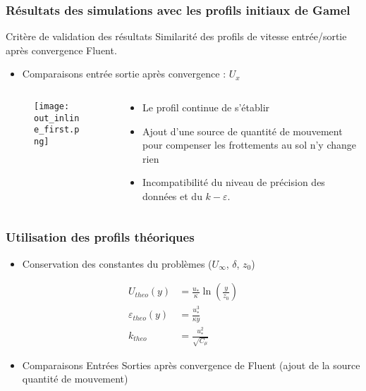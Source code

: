 \documentclass[12pt, xcolor=svgnames]{beamer}
\newcommand{\keps}{$k-\varepsilon$}
\newcommand{\qttmvt}{quantité de mouvement}
\newcommand{\bwarrow}{\item[\color{DarkRed} \ding{227}]}
\newcommand{\bepar}[1]{
	\left( #1 \right)  
}
\begin{document}
\begin{frame}
\frametitle{Résultats des simulations avec les profils initiaux de Gamel}
	\begin{block}{Critère de validation des résultats}
		Similarité des profils de vitesse entrée/sortie après convergence Fluent.
	\end{block}	
	\pause
	\begin{itemize}
		\bwarrow Comparaisons entrée sortie après convergence : $U_x$
	\end{itemize}
\begin{columns}
\begin{column}{0.5\textwidth}
\vspace{-1.1cm}
\begin{figure}[!ht]
\centering
\texttt{[image: out\_inline\_first.png]}
\end{figure}
\end{column}
\begin{column}{0.5\textwidth}
\begin{itemize}
	\bwarrow \small{Le profil continue de s'établir} \\
	\bwarrow \small{Ajout d'une source de \qttmvt $ $ pour compenser les frottements au sol n'y change rien} \\ 
	\bwarrow \small{Incompatibilité du niveau de précision des données et du \keps.}
\end{itemize}

\end{column}
\end{columns}
\end{frame}

\begin{frame}
\frametitle{Utilisation des profils théoriques}
\begin{itemize}
	\bwarrow Conservation  des constantes du problèmes ($U_\infty$, $\delta$, $z_0$)
\end{itemize}

\begin{align*}
U_{theo}(y) &= \frac{u_*}{\kappa} \ln\bepar{\frac{y}{z_0}} \\
\varepsilon_{theo} (y) &= \frac{u_*^3}{\kappa y} \\
k_{theo}\ \ \ \ & = \frac{u_*^2}{\sqrt{C_\mu}} 
\end{align*}

\begin{itemize}
\bwarrow Comparaisons Entrées Sorties après convergence de Fluent (ajout de la source \qttmvt)
\end{itemize}

\end{frame}
\end{document}
